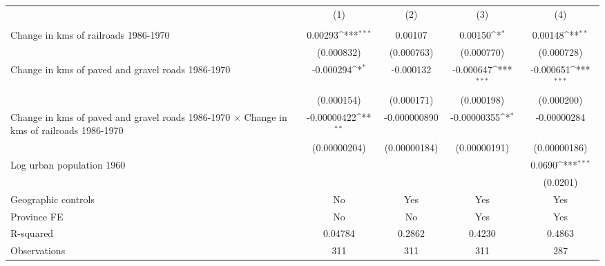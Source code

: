 {
\def\sym#1{\ifmmode^{#1}\else\(^{#1}\)\fi}
\begin{tabular}{l*{4}{c}}
\hline\hline
                &\multicolumn{1}{c}{(1)}&\multicolumn{1}{c}{(2)}&\multicolumn{1}{c}{(3)}&\multicolumn{1}{c}{(4)}\\
                &\multicolumn{1}{c}{}&\multicolumn{1}{c}{}&\multicolumn{1}{c}{}&\multicolumn{1}{c}{}\\
\hline
Change in kms of railroads 1986-1970&  0.00293\sym{***}&  0.00107         &  0.00150\sym{*}  &  0.00148\sym{**} \\
                &(0.000832)         &(0.000763)         &(0.000770)         &(0.000728)         \\
[1em]
Change in kms of paved and gravel roads 1986-1970&-0.000294\sym{*}  &-0.000132         &-0.000647\sym{***}&-0.000651\sym{***}\\
                &(0.000154)         &(0.000171)         &(0.000198)         &(0.000200)         \\
[1em]
Change in kms of paved and gravel roads 1986-1970 $\times$ Change in kms of railroads 1986-1970&-0.00000422\sym{**} &-0.000000890         &-0.00000355\sym{*}  &-0.00000284         \\
                &(0.00000204)         &(0.00000184)         &(0.00000191)         &(0.00000186)         \\
[1em]
Log urban population 1960&                  &                  &                  &   0.0690\sym{***}\\
                &                  &                  &                  & (0.0201)         \\
\hline
Geographic controls&       No         &      Yes         &      Yes         &      Yes         \\
Province FE     &       No         &       No         &      Yes         &      Yes         \\
R-squared       &  0.04784         &   0.2862         &   0.4230         &   0.4863         \\
Observations    &      311         &      311         &      311         &      287         \\
\hline\hline
\end{tabular}
}

